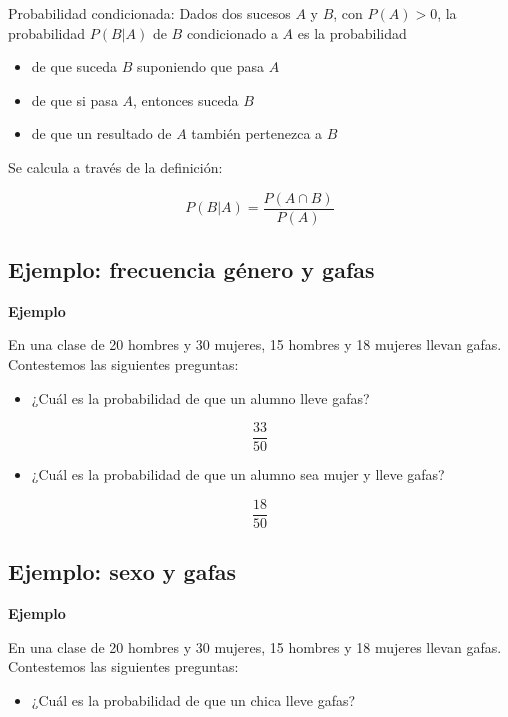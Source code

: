 \documentclass[]{book}
\providecommand{\tightlist}{%
  \setlength{\itemsep}{0pt}\setlength{\parskip}{0pt}}
\begin{document}
 Probabilidad condicionada: Dados dos sucesos \(A\) y \(B\), con \(P(A)>0\), la probabilidad \(P(B|A)\) de \(B\) condicionado a \(A\) es la probabilidad

\begin{itemize}
\tightlist
\item
  de que suceda \(B\) suponiendo que pasa \(A\)
\item
  de que si pasa \(A\), entonces suceda \(B\)
\item
  de que un resultado de \(A\) también pertenezca a \(B\)
\end{itemize}

Se calcula a través de la definición:

\[
P(B|A)=\frac{P(A\cap B)}{P(A)}
\]

\hypertarget{ejemplo-frecuencia-guxe9nero-y-gafas}{%
\subsection{Ejemplo: frecuencia género y gafas}\label{ejemplo-frecuencia-guxe9nero-y-gafas}}

\textbf{Ejemplo}

En una clase de 20 hombres y 30 mujeres, 15 hombres y 18 mujeres llevan gafas. Contestemos las siguientes preguntas:

\begin{itemize}
\tightlist
\item
  ¿Cuál es la probabilidad de que un alumno lleve gafas?
\end{itemize}

\[
\frac{33}{50}
\]

\begin{itemize}
\tightlist
\item
  ¿Cuál es la probabilidad de que un alumno sea mujer y lleve gafas?
\end{itemize}

\[
\frac{18}{50}
\]

\hypertarget{ejemplo-sexo-y-gafas}{%
\subsection{Ejemplo: sexo y gafas}\label{ejemplo-sexo-y-gafas}}

\textbf{Ejemplo}

En una clase de 20 hombres y 30 mujeres, 15 hombres y 18 mujeres llevan gafas. Contestemos las siguientes preguntas:

\begin{itemize}
\tightlist
\item
  ¿Cuál es la probabilidad de que un chica lleve gafas?
\end{itemize}
\end{document}
